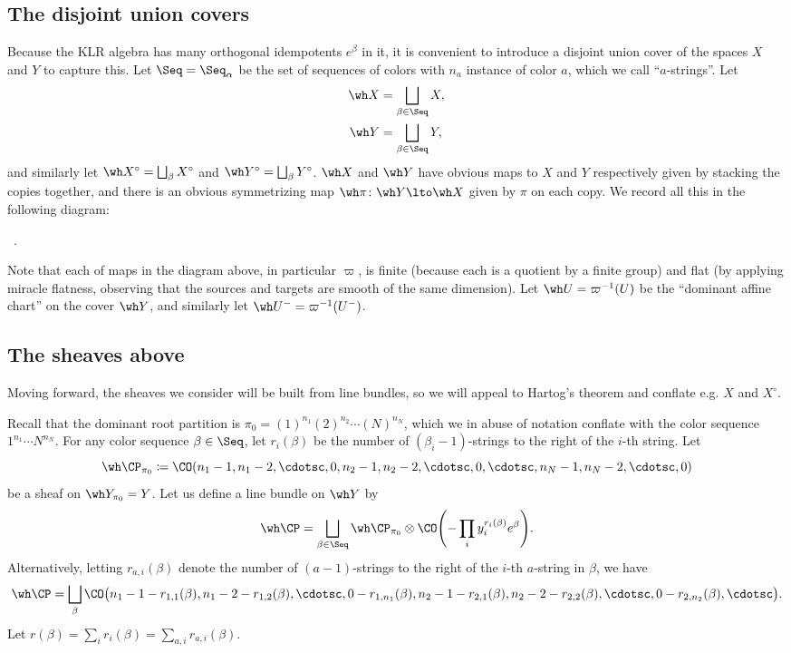 \documentclass[11pt,reqno]{amsart}
\begin{document}
\subsection{The disjoint union covers}
Because the KLR algebra has many orthogonal idempotents $e^\beta$ in it, it is convenient to introduce a disjoint union cover of the spaces $X$ and $Y$ to capture this. Let $\Seq=\Seq_\alpha$ be the set of sequences of colors with $n_a$ instance of color $a$, which we call ``$a$-strings''. Let
\begin{align*}
    \wh X&=\bigsqcup_{\beta\in\Seq} X,\\
    \wh Y&=\bigsqcup_{\beta\in\Seq} Y,
\end{align*}
and similarly let $\wh X^\circ=\bigsqcup_\beta X^\circ$ and $\wh Y^\circ=\bigsqcup_\beta Y^\circ$. $\wh X$ and $\wh Y$ have obvious maps to $X$ and $Y$ respectively given by stacking the copies together, and there is an obvious symmetrizing map $\wh\pi\colon\wh Y\lto \wh X$ given by $\pi$ on each copy. We record all this in the following diagram:
\begin{center}
    \ .
\end{center}
Note that each of maps in the diagram above, in particular $\varpi$, is finite (because each is a quotient by a finite group) and flat (by applying miracle flatness, observing that the sources and targets are smooth of the same dimension). Let $\wh U=\varpi^{-1}(U)$ be the ``dominant affine chart'' on the cover $\wh Y$, and similarly let $\wh U^-=\varpi^{-1}(U^-)$. 


\subsection{The sheaves above}
Moving forward, the sheaves we consider will be built from line bundles, so we will appeal to Hartog's theorem and conflate e.g. $X$ and $X^\circ$. 

Recall that the dominant root partition is $\pi_0=(1)^{n_1}(2)^{n_2}\cdots (N)^{n_N}$, which we in abuse of notation conflate with the color sequence $1^{n_1}\cdots N^{n_N}$. For any color sequence $\beta\in\Seq$, let $r_i(\beta)$ be the number of $(\beta_i-1)$-strings to the right of the $i$-th string. Let 
\[\wh\CP_{\pi_0}\coloneqq \CO(n_1-1,n_1-2,\cdotsc,0,n_2-1,n_2-2,\cdotsc,0,\cdotsc,n_N-1,n_N-2,\cdotsc,0)\] 
be a sheaf on $\wh Y_{\pi_0}=Y$. Let us define a line bundle on $\wh Y$ by 
\[\wh\CP=\bigsqcup_{\beta\in\Seq}\wh\CP_{\pi_0}\otimes\CO\pr*{-\prod_i y_i^{r_i(\beta)}e^\beta}.\]
Alternatively, letting $r_{a,i}(\beta)$ denote the number of $(a-1)$-strings to the right of the $i$-th $a$-string in $\beta$, we have 
\[\wh\CP=\bigsqcup_\beta \CO\big(n_1-1-r_{1,1}(\beta),n_1-2-r_{1,2}(\beta),\cdotsc,0-r_{1,n_1}(\beta),n_2-1-r_{2,1}(\beta),n_2-2-r_{2,2}(\beta),\cdotsc,0-r_{2,n_2}(\beta)  ,\cdotsc\big).\]
Let $r(\beta)=\sum_i r_i(\beta)=\sum_{a,i}r_{a,i}(\beta)$. 
\end{document}
